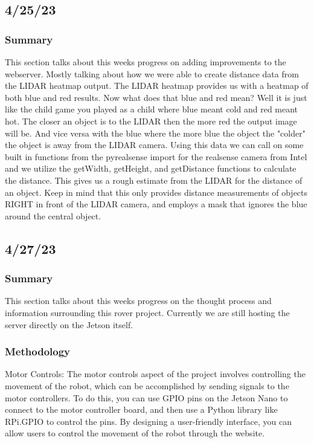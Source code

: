 \documentclass[a4paper, 10pt]{article}
\begin{document}
    \subsection{4/25/23}
        \subsubsection{Summary}
        This section talks about this weeks progress on adding improvements to the webserver. Mostly talking about how we were able to create distance data from the LIDAR heatmap output. The LIDAR heatmap provides us with a heatmap of both blue and red results.
        Now what does that blue and red mean? Well it is just like the child game you played as a child where blue meant cold and red meant hot. The closer an object is to the LIDAR then the more red the output image will be. And vice versa with the blue where the more blue the object the "colder" the object is away from the LIDAR camera. Using this data we can call on some built in functions from the pyrealsense import for the realsense camera from Intel and we utilize the getWidth, getHeight, and getDistance functions to calculate the distance. This gives us a rough estimate from the LIDAR for the distance of an object. Keep in mind that this only provides distance measurements of objects RIGHT in front of the LIDAR camera, and employs a mask that ignores the blue around the central object. 

    \subsection{4/27/23}
        \subsubsection{Summary}
        This section talks about this weeks progress on the thought process and information surrounding this rover project.
        Currently we are still hosting the server directly on the Jetson itself.
        \subsubsection{Methodology}
        Motor Controls: The motor controls aspect of the project involves controlling the movement of the robot, which can be accomplished by sending signals to the motor controllers. To do this, you can use GPIO pins on the Jetson Nano to connect to the motor controller board, and then use a Python library like RPi.GPIO to control the pins. By designing a user-friendly interface, you can allow users to control the movement of the robot through the website.
        
\end{document}
